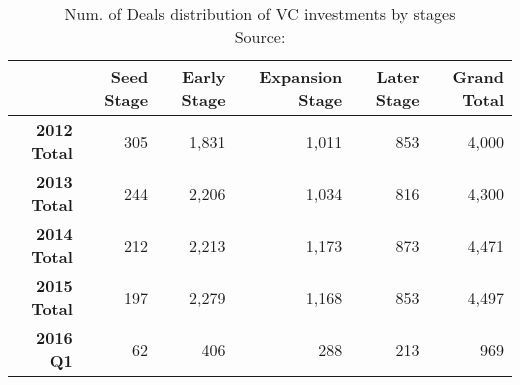 \begin{table}[!htbp]
    \centering
    \hspace*{-1.5cm}
    \begin{tabular}{rrrrrr}
                        & \textbf{Seed Stage} & \textbf{Early Stage} & \textbf{Expansion Stage} & \textbf{Later Stage} & \textbf{Grand Total} \\ \hline
    \textbf{2012 Total} & 305                 & 1,831                & 1,011                    & 853                  & 4,000                \\ \hline
    \textbf{2013 Total} & 244                 & 2,206                & 1,034                    & 816                  & 4,300                \\ \hline
    \textbf{2014 Total} & 212                 & 2,213                & 1,173                    & 873                  & 4,471                \\ \hline
    \textbf{2015 Total} & 197                 & 2,279                & 1,168                    & 853                  & 4,497                \\ \hline
    \textbf{2016 Q1}    & 62                  & 406                  & 288                      & 213                  & 969                 
    \end{tabular}
\caption{Num. of Deals distribution of VC investments by stages\\Source: \parencite{moneytree}}
\label{tab:vc_stage_num}
\hspace*{-1cm}
\end{table}

